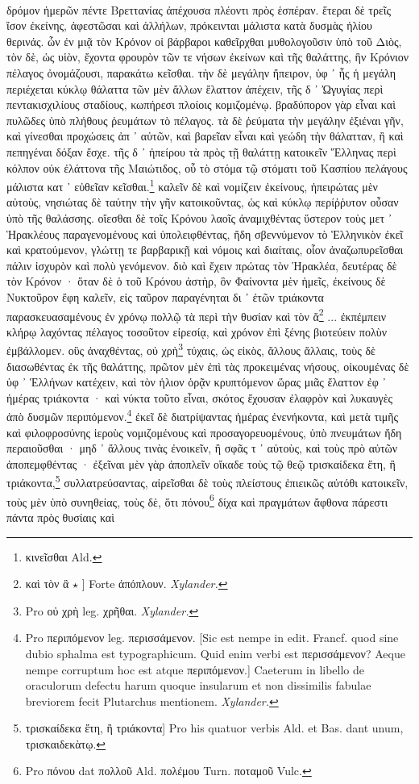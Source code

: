 \documentclass[a4paper, 11pt, oneside, polutonikogreek, german]{article}
\begin{document}
\paragraph{}
δρόμον ἡμερῶν πέντε Βρεττανίας ἀπέχουσα πλέοντι πρὸς ἑσπέραν. ἕτεραι δὲ τρεῖς ἴσον ἐκείνης, ἀφεστῶσαι καὶ ἀλλήλων, πρόκεινται μάλιστα κατὰ δυσμὰς ἡλίου θερινάς. ὧν ἐν μιᾷ τὸν Κρόνον οἱ βάρβαροι καθεῖρχθαι μυθολογοῦσιν ὑπὸ τοῦ Διὸς, τὸν δὲ, ὡς υἱὸν, ἔχοντα φρουρὸν τῶν τε νήσων ἐκείνων καὶ τῆς θαλάττης, ἣν Κρόνιον πέλαγος ὀνομάζουσι, παρακάτω κεῖσθαι. τὴν δὲ μεγάλην ἤπειρον, ὑφ ᾽ ἧς ἡ μεγάλη περιέχεται κύκλῳ θάλαττα τῶν μὲν ἄλλων ἔλαττον ἀπέχειν, τῆς δ ᾽ Ὠγυγίας περὶ πεντακισχιλίους σταδίους, κωπήρεσι πλοίοις κομιζομένῳ. βραδύπορον γὰρ εἶναι καὶ πυλῶδες ὑπὸ πλήθους ῥευμάτων τὸ πέλαγος. τὰ δὲ ῥεύματα τὴν μεγάλην ἐξιέναι γῆν, καὶ γίνεσθαι προχώσεις ἀπ ᾽ αὐτῶν, καὶ βαρεῖαν εἶναι καὶ γεώδη τὴν θάλατταν, ἢ καὶ πεπηγέναι δόξαν ἔσχε. τῆς δ ᾽ ἠπείρου τὰ πρὸς τῇ θαλάττῃ κατοικεῖν Ἕλληνας περὶ κόλπον οὐκ ἐλάττονα τῆς Μαιώτιδος, οὗ τὸ στόμα τῷ στόματι τοῦ Κασπίου πελάγους μάλιστα κατ ᾽ εὐθεῖαν κεῖσθαι.\footnote{κινεῖσθαι Ald.} καλεῖν δὲ καὶ νομίζειν ἐκείνους, ἠπειρώτας μὲν αὐτοὺς, νησιώτας δὲ ταύτην τὴν γῆν κατοικοῦντας, ὡς καὶ κύκλῳ περίῤῥυτον οὖσαν ὑπὸ τῆς θαλάσσης. οἴεσθαι δὲ τοῖς Κρόνου λαοῖς ἀναμιχθέντας ὕστερον τοὺς μετ ᾽ Ἡρακλέους παραγενομένους καὶ ὑπολειφθέντας, ἤδη σβεννύμενον τὸ Ἑλληνικὸν ἐκεῖ καὶ κρατούμενον, γλώττῃ τε βαρβαρικῇ καὶ νόμοις καὶ διαίταις, οἷον ἀναζωπυρεῖσθαι πάλιν ἰσχυρὸν καὶ πολὺ γενόμενον. διὸ καὶ ἔχειν πρώτας τὸν Ἡρακλέα, δευτέρας δὲ τὸν Κρόνον · ὅταν δὲ ὁ τοῦ Κρόνου ἀστὴρ, ὃν Φαίνοντα μὲν ἡμεῖς, ἐκείνους δὲ Νυκτοῦρον ἔφη καλεῖν, εἰς ταῦρον παραγένηται δι ᾽ ἐτῶν τριάκοντα παρασκευασαμένους ἐν χρόνῳ πολλῷ τὰ περὶ τὴν θυσίαν καὶ τὸν ἄ\footnote{καὶ τὸν ἂ $\star$ ] Forte ἀπόπλουν. \emph{Xylander.}} ... ἐκπέμπειν κλήρῳ λαχόντας πέλαγος τοσοῦτον εἰρεσίᾳ, καὶ χρόνον ἐπὶ ξένης βιοτεύειν πολὺν ἐμβάλλομεν. οὓς ἀναχθέντας, οὐ χρὴ\footnote{Pro οὐ χρὴ leg. χρῆθαι. \emph{Xylander.}} τύχαις, ὡς εἰκὸς, ἄλλους ἄλλαις, τοὺς δὲ διασωθέντας ἐκ τῆς θαλάττης, πρῶτον μὲν ἐπὶ τὰς προκειμένας νήσους, οἰκουμένας δὲ ὑφ ᾽ Ἑλλήνων κατέχειν, καὶ τὸν ἡλιον ὁρᾷν κρυπτόμενον ὥρας μιᾶς ἔλαττον ἐφ ᾽ ἡμέρας τριάκοντα · καὶ νύκτα τοῦτο εἶναι, σκότος ἔχουσαν ἐλαφρὸν καὶ λυκαυγὲς ἀπὸ δυσμῶν περιπόμενον.\footnote{Pro περιπόμενον leg. περισσάμενον. [Sic est nempe in edit. Francf. quod sine dubio sphalma est typographicum. Quid enim verbi est περισσάμενον? Aeque nempe corruptum hoc est atque περιπόμενον.] Caeterum in libello de oraculorum defectu harum quoque insularum et non dissimilis fabulae breviorem fecit Plutarchus mentionem. \emph{Xylander.}} ἐκεῖ δὲ διατρίψαντας ἡμέρας ἐνενήκοντα, καὶ μετὰ τιμῆς καὶ φιλοφροσύνης ἱεροὺς νομιζομένους καὶ προσαγορευομένους, ὑπὸ πνευμάτων ἤδη περαιοῦσθαι · μηδ ᾽ ἄλλους τινὰς ἐνοικεῖν, ἢ σφᾶς τ ᾽ αὐτοὺς, καὶ τοὺς πρὸ αὐτῶν ἀποπεμφθέντας · ἐξεῖναι μὲν γὰρ ἀποπλεῖν οἴκαδε τοὺς τῷ θεῷ τρισκαίδεκα ἔτη, ἢ τριάκοντα,\footnote{τρισκαίδεκα ἔτη, ἢ τριάκοντα] Pro his quatuor verbis Ald. et Bas. dant unum, τρισκαιδεκὰτῳ.} συλλατρεύσαντας, αἱρεῖσθαι δὲ τοὺς πλείστους ἐπιεικῶς αὐτόθι κατοικεῖν, τοὺς μὲν ὑπὸ συνηθείας, τοὺς δὲ, ὅτι πόνου\footnote{Pro πόνου dat πολλοῦ Ald. πολέμου Turn. ποταμοῦ Vulc.} δίχα καὶ πραγμάτων ἄφθονα πάρεστι πάντα πρὸς θυσίαις καὶ 
\end{document}
